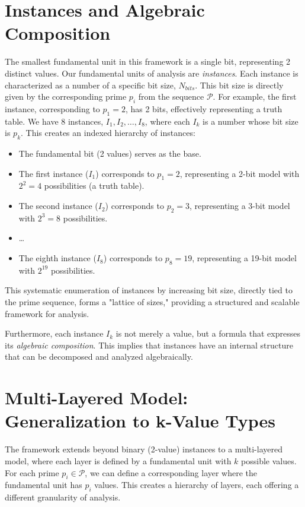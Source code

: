 \documentclass{article}
\begin{document}
\section{Instances and Algebraic Composition}
The smallest fundamental unit in this framework is a single bit, representing 2 distinct values. Our fundamental units of analysis are \textit{instances}. Each instance is characterized as a number of a specific bit size, $N_{bits}$. This bit size is directly given by the corresponding prime $p_i$ from the sequence $\mathcal{P}$. For example, the first instance, corresponding to $p_1=2$, has 2 bits, effectively representing a truth table. We have 8 instances, $I_1, I_2, \ldots, I_8$, where each $I_k$ is a number whose bit size is $p_k$. This creates an indexed hierarchy of instances:
\begin{itemize}
    \item The fundamental bit (2 values) serves as the base.
    \item The first instance ($I_1$) corresponds to $p_1=2$, representing a 2-bit model with $2^2=4$ possibilities (a truth table).
    \item The second instance ($I_2$) corresponds to $p_2=3$, representing a 3-bit model with $2^3=8$ possibilities.
    \item \ldots
    \item The eighth instance ($I_8$) corresponds to $p_8=19$, representing a 19-bit model with $2^{19}$ possibilities.
\end{itemize}
This systematic enumeration of instances by increasing bit size, directly tied to the prime sequence, forms a "lattice of sizes," providing a structured and scalable framework for analysis.

Furthermore, each instance $I_k$ is not merely a value, but a formula that expresses its \textit{algebraic composition}. This implies that instances have an internal structure that can be decomposed and analyzed algebraically.

\section{Multi-Layered Model: Generalization to k-Value Types}
The framework extends beyond binary (2-value) instances to a multi-layered model, where each layer is defined by a fundamental unit with $k$ possible values. For each prime $p_i \in \mathcal{P}$, we can define a corresponding layer where the fundamental unit has $p_i$ values. This creates a hierarchy of layers, each offering a different granularity of analysis.
\end{document}

